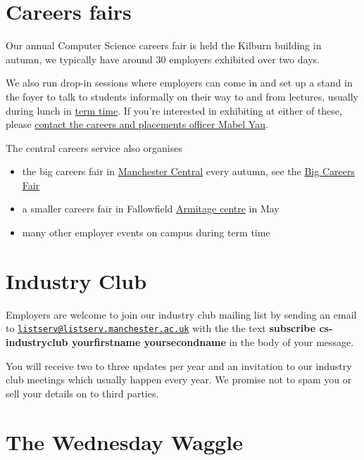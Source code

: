 \documentclass[12pt,]{book}
\providecommand{\tightlist}{%
  \setlength{\itemsep}{0pt}\setlength{\parskip}{0pt}}
\begin{document}
\hypertarget{careers-fairs}{%
\section{Careers fairs}\label{careers-fairs}}

Our annual Computer Science careers fair is held the Kilburn building in autumn, we typically have around 30 employers exhibited over two days.

We also run drop-in sessions where employers can come in and set up a stand in the foyer to talk to students informally on their way to and from lectures, usually during lunch in \href{https://www.manchester.ac.uk/discover/key-dates/}{term time}. If you're interested in exhibiting at either of these, please \protect\hyperlink{contact}{contact the careers and placements officer Mabel Yau}.

The central careers service also organises

\begin{itemize}
\tightlist
\item
  the big careers fair in \href{https://www.manchestercentral.co.uk/}{Manchester Central} every autumn, see the \href{http://www.careers.manchester.ac.uk/events/bigcareersfair/}{Big Careers Fair}
\item
  a smaller careers fair in Fallowfield \href{http://www.sport.manchester.ac.uk/facilities/armitage/}{Armitage centre} in May
\item
  many other employer events on campus during term time
\end{itemize}

\hypertarget{industry-club}{%
\section{Industry Club}\label{industry-club}}

Employers are welcome to join our industry club mailing list by sending an email to \href{mailto:listserv@listserv.manchester.ac.uk}{\nolinkurl{listserv@listserv.manchester.ac.uk}} with the the text \textbf{subscribe cs-industryclub yourfirstname yoursecondname} in the body of your message.

You will receive two to three updates per year and an invitation to our industry club meetings which usually happen every year. We promise not to spam you or sell your details on to third parties.

\hypertarget{the-wednesday-waggle}{%
\section{The Wednesday Waggle}\label{the-wednesday-waggle}}
\end{document}
